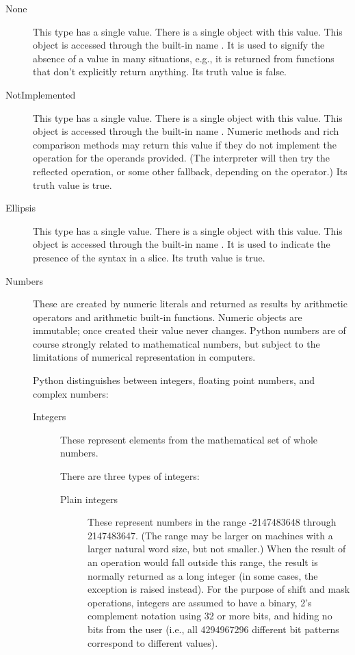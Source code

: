 \begin{description}

\item[None]
This type has a single value.  There is a single object with this value.
This object is accessed through the built-in name .
It is used to signify the absence of a value in many situations, e.g.,
it is returned from functions that don't explicitly return anything.
Its truth value is false.

\item[NotImplemented]
This type has a single value.  There is a single object with this value.
This object is accessed through the built-in name .
Numeric methods and rich comparison methods may return this value if
they do not implement the operation for the operands provided.  (The
interpreter will then try the reflected operation, or some other
fallback, depending on the operator.)  Its truth value is true.

\item[Ellipsis]
This type has a single value.  There is a single object with this value.
This object is accessed through the built-in name .
It is used to indicate the presence of the  syntax in a
slice.  Its truth value is true.

\item[Numbers]
These are created by numeric literals and returned as results by
arithmetic operators and arithmetic built-in functions.  Numeric
objects are immutable; once created their value never changes.  Python
numbers are of course strongly related to mathematical numbers, but
subject to the limitations of numerical representation in computers.

Python distinguishes between integers, floating point numbers, and
complex numbers:

\begin{description}
\item[Integers]
These represent elements from the mathematical set of whole numbers.

There are three types of integers:

\begin{description}

\item[Plain integers]
These represent numbers in the range -2147483648 through 2147483647.
(The range may be larger on machines with a larger natural word
size, but not smaller.)
When the result of an operation would fall outside this range, the
result is normally returned as a long integer (in some cases, the
exception  is raised instead).
For the purpose of shift and mask operations, integers are assumed to
have a binary, 2's complement notation using 32 or more bits, and
hiding no bits from the user (i.e., all 4294967296 different bit
patterns correspond to different values).


\end{description}
\end{description}
\end{description}
